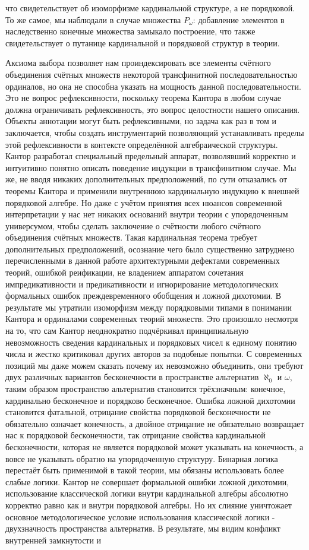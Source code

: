 \documentclass[12pt]{article}
\begin{document}
что свидетельствует об изоморфизме кардинальной структуре, а не порядковой. То же самое, мы наблюдали в случае множества $P_{\omega}$: добавление элементов в наследственно конечные множества замыкало построение, что также свидетельствует о путанице кардинальной и порядковой структур в теории. 

Аксиома выбора позволяет нам проиндексировать все элементы счётного объединения счётных множеств некоторой трансфинитной последовательностью ординалов, но она не способна указать на мощность данной последовательности. Это не вопрос рефлексивности, поскольку теорема Кантора в любом случае должна ограничивать рефлексивность, это вопрос целостности нашего описания. Объекты аннотации могут быть рефлексивными, но задача как раз в том и заключается, чтобы создать инструментарий позволяющий устанавливать пределы этой рефлексивности в контексте определённой алгебраической структуры. Кантор разработал специальный предельный аппарат, позволявший корректно и интуитивно понятно описать поведение индукции в трансфинитном случае. Мы же, не вводя никаких дополнительных предположений, по сути отказались от теоремы Кантора и применили внутреннюю кардинальную индукцию к внешней порядковой алгебре. Но даже с учётом принятия всех нюансов современной интерпретации у нас нет никаких оснований внутри теории с упорядоченным универсумом, чтобы сделать заключение о счётности любого счётного объединения счётных множеств. Такая кардинальная теорема требует дополнительных предположений, осознание чего было существенно затруднено перечисленными в данной работе архитектурными дефектами современных теорий, ошибкой реификации, не владением аппаратом сочетания импредикативности и предикативности и игнорирование методологических формальных ошибок преждевременного обобщения и ложной дихотомии. В результате мы утратили изоморфизм между порядковыми типами в понимании Кантора и ординалами современных теорий множеств. Это произошло несмотря на то, что сам Кантор неоднократно подчёркивал принципиальную невозможность сведения кардинальных и порядковых чисел к единому понятию числа и жестко критиковал других авторов за подобные попытки. С современных позиций мы даже можем сказать почему их невозможно объединить, они требуют двух различных вариантов бесконечности в пространстве альтернатив $\aleph_0$ и $\omega$, таким образом пространство альтернатив становится трёхзначным: конечное, кардинально бесконечное и порядково бесконечное. Ошибка ложной дихотомии становится фатальной, отрицание свойства порядковой бесконечности не обязательно означает конечность, а двойное отрицание не обязательно возвращает нас к порядковой бесконечности, так отрицание свойства кардинальной бесконечности, которая не является порядковой может указывать на конечность, а вовсе не указывать обратно на упорядоченную структуру. Бинарная логика перестаёт быть применимой в такой теории, мы обязаны использовать более слабые логики. Кантор не совершает формальной ошибки ложной дихотомии, использование классической логики внутри кардинальной алгебры абсолютно корректно равно как и внутри порядковой алгебры. Но их слияние уничтожает основное методологическое условие использования классической логики - двухзначность пространства альтернатив. В результате, мы видим конфликт внутренней замкнутости и 
\end{document}
